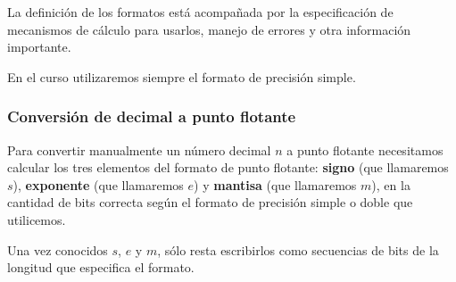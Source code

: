 \documentclass[spanish,A4,]{article}
\begin{document}
La definición de los formatos está acompañada por la especificación de
mecanismos de cálculo para usarlos, manejo de errores y otra información
importante.

En el curso utilizaremos siempre el formato de precisión simple.

\subsubsection{Conversión de decimal a punto
flotante}\label{conversiuxf3n-de-decimal-a-punto-flotante}

Para convertir manualmente un número decimal $n$ a punto flotante
necesitamos calcular los tres elementos del formato de punto flotante:
\textbf{signo} (que llamaremos $s$), \textbf{exponente} (que llamaremos
$e$) y \textbf{mantisa} (que llamaremos $m$), en la cantidad de bits
correcta según el formato de precisión simple o doble que utilicemos.

Una vez conocidos $s$, $e$ y $m$, sólo resta escribirlos como secuencias
de bits de la longitud que especifica el formato.
\end{document}
